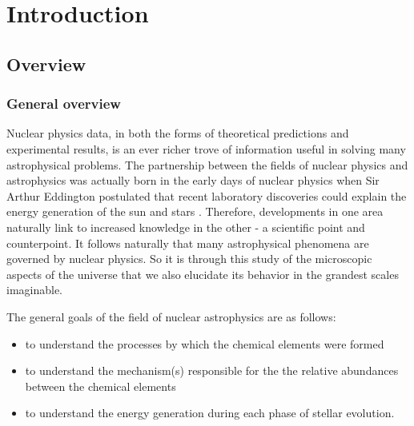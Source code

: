 %
%
%
%
%
%
%
%
%
%


%
%

\chapter{Introduction}
\label{chap: introduction}

\section{Overview}
\label{sec: Nuclear astrophysics overview}

\subsection{General overview}

Nuclear physics data, in both the forms of theoretical predictions and experimental results, is an ever richer trove of information useful in solving many astrophysical problems. The partnership between the fields of nuclear physics and astrophysics was actually born in the early days of nuclear physics when Sir Arthur Eddington postulated that recent laboratory discoveries could explain the energy generation of the sun and stars \cite{IliadisBook}. Therefore, developments in one area naturally link to increased knowledge in the other - a scientific point and counterpoint. It follows naturally that many astrophysical phenomena are governed by nuclear physics. So it is through this study of the microscopic aspects of the universe that we also elucidate its behavior in the grandest scales imaginable. 

The general goals of the field of nuclear astrophysics are as follows:
\begin{itemize}
\item to understand the processes by which the chemical elements were formed
\item to understand the mechanism(s) responsible for the the relative abundances between the chemical elements
\item to understand the energy generation during each phase of stellar evolution.
\end{itemize}

